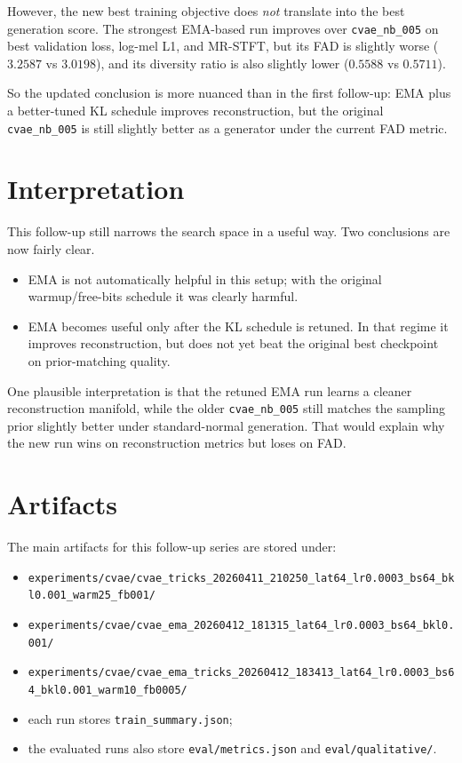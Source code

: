 \documentclass[10pt]{article}
\begin{document}
However, the new best training objective does \emph{not} translate into the best generation score.
The strongest EMA-based run improves over \texttt{cvae\_nb\_005} on best validation loss, log-mel L1, and MR-STFT,
but its FAD is slightly worse (\(3.2587\) vs \(3.0198\)), and its diversity ratio is also slightly lower (\(0.5588\) vs \(0.5711\)).

So the updated conclusion is more nuanced than in the first follow-up:
EMA plus a better-tuned KL schedule improves reconstruction,
but the original \texttt{cvae\_nb\_005} is still slightly better as a generator under the current FAD metric.

\section{Interpretation}
This follow-up still narrows the search space in a useful way.
Two conclusions are now fairly clear.

\begin{itemize}
\item EMA is not automatically helpful in this setup; with the original warmup/free-bits schedule it was clearly harmful.
\item EMA becomes useful only after the KL schedule is retuned. In that regime it improves reconstruction, but does not yet beat the original best checkpoint on prior-matching quality.
\end{itemize}

One plausible interpretation is that the retuned EMA run learns a cleaner reconstruction manifold, while the older \texttt{cvae\_nb\_005} still matches the sampling prior slightly better under standard-normal generation.
That would explain why the new run wins on reconstruction metrics but loses on FAD.

\section{Artifacts}
The main artifacts for this follow-up series are stored under:
\begin{itemize}
\item \texttt{experiments/cvae/cvae\_tricks\_20260411\_210250\_lat64\_lr0.0003\_bs64\_bkl0.001\_warm25\_fb001/}
\item \texttt{experiments/cvae/cvae\_ema\_20260412\_181315\_lat64\_lr0.0003\_bs64\_bkl0.001/}
\item \texttt{experiments/cvae/cvae\_ema\_tricks\_20260412\_183413\_lat64\_lr0.0003\_bs64\_bkl0.001\_warm10\_fb0005/}
\item each run stores \texttt{train\_summary.json};
\item the evaluated runs also store \texttt{eval/metrics.json} and \texttt{eval/qualitative/}.
\end{itemize}
\end{document}
